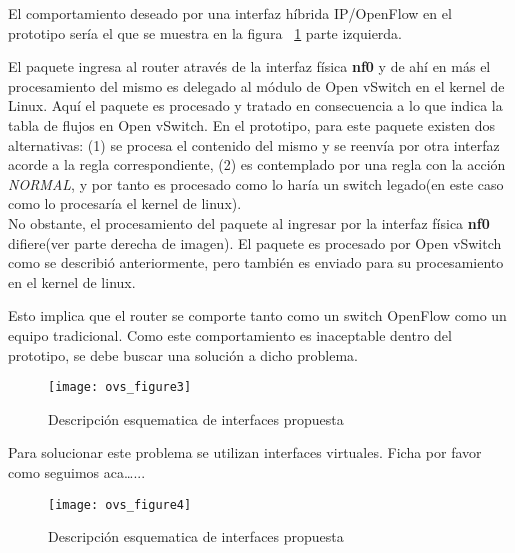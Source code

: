 \begin{enumerate}

El comportamiento deseado por una interfaz h\'ibrida IP/OpenFlow en el prototipo ser\'ia el que se muestra en la figura ~\ref{fig:OVSInterfaces} parte izquierda.

El paquete ingresa al router atrav\'es de la interfaz f\'isica \textbf{nf0} y de ah\'i en m\'as el procesamiento del mismo es delegado al m\'odulo de Open vSwitch en el kernel de Linux. Aqu\'i el paquete es procesado y tratado en consecuencia a lo que indica la tabla de flujos en Open vSwitch. En el prototipo, para este paquete existen dos alternativas: (1) se procesa el contenido del mismo y se reenv\'ia por otra interfaz acorde a la regla correspondiente, (2) es contemplado por una regla con la acci\'on \textit{NORMAL}, y por tanto es procesado como lo har\'ia un switch legado(en este caso como lo procesar\'ia el kernel de linux).\\

No obstante, el procesamiento del paquete al ingresar por la interfaz f\'isica \textbf{nf0} difiere(ver parte derecha de imagen). El paquete es procesado por Open vSwitch como se describi\'o anteriormente, pero tambi\'en es enviado para su procesamiento en el kernel de linux.

Esto implica que el router se comporte tanto como un switch OpenFlow como un equipo tradicional. Como este comportamiento es inaceptable dentro del prototipo, se debe buscar una solución a dicho problema.

\begin{figure}[htbp!] 
\centering    
\texttt{[image: ovs\_figure3]}
\caption[OVSInterfaces]{Descripci\'on esquematica de interfaces propuesta}
\label{fig:OVSInterfaces}
\end{figure}

Para solucionar este problema se utilizan interfaces virtuales. Ficha por favor como seguimos aca\dots...

\begin{figure}[htbp!] 
\centering    
\texttt{[image: ovs\_figure4]}
\caption[OVSInterfaces2]{Descripci\'on esquematica de interfaces propuesta}
\label{fig:OVSInterfaces2}
\end{figure}

\end{enumerate}

